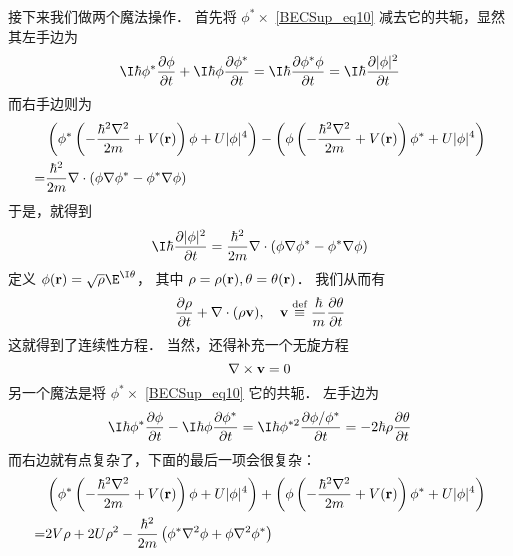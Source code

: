 接下来我们做两个魔法操作． 首先将 $\phi^*\times$ \autoref{BECSup_eq10} 减去它的共轭，显然其左手边为
\begin{equation}
\I\hbar\phi^*\frac{\partial\phi}{\partial t} + \I\hbar\phi\frac{\partial\phi^*}{\partial t} = \I\hbar\frac{\partial\phi^*\phi}{\partial t} = \I\hbar\frac{\partial|\phi|^2}{\partial t}
\end{equation}
而右手边则为
\begin{equation}
\begin{split}
&\left(\phi^* \left(-\frac{\hbar^2\nabla^2}{2m}+V({\bf r})\right)\phi + U|\phi|^4\right) -\left(\phi \left(-\frac{\hbar^2\nabla^2}{2m}+V({\bf r})\right)\phi^* + U|\phi|^4\right) \\
=& \frac{\hbar^2}{2m}\nabla\cdot\left(\phi\nabla\phi^* - \phi^*\nabla\phi\right)
\end{split}
\end{equation}
于是，就得到
\[\I\hbar\frac{\partial|\phi|^2}{\partial t} = \frac{\hbar^2}{2m}\nabla\cdot\left(\phi\nabla\phi^* - \phi^*\nabla\phi\right) \]
定义 $\phi({\bf r}) = \sqrt{\rho}\E^{\I\theta}$， 其中 $\rho = \rho({\bf r}),\theta = \theta({\bf r})$．
我们从而有
\begin{equation}\frac{\partial\rho}{\partial t} + \nabla\cdot(\rho{\bf v}),\quad {\bf v}\overset{\text{def}}{\equiv}\frac{\hbar}{m}\frac{\partial\theta}{\partial t} \end{equation}
这就得到了连续性方程． 当然，还得补充一个无旋方程
\begin{equation}
\nabla\times{\bf v}=0
\end{equation}
另一个魔法是将 $\phi^*\times$ \autoref{BECSup_eq10}%
它的共轭． 左手边为
\begin{equation}
\I\hbar\phi^*\frac{\partial\phi}{\partial t} - \I\hbar\phi\frac{\partial\phi^*}{\partial t} = \I\hbar\phi^{*2}\frac{\partial \phi/\phi^*}{\partial t} = -2\hbar\rho\frac{\partial\theta}{\partial t}
\end{equation}
而右边就有点复杂了，下面的最后一项会很复杂：
\begin{equation}
\begin{split}
&\left(\phi^* \left(-\frac{\hbar^2\nabla^2}{2m}+V({\bf r})\right)\phi + U|\phi|^4\right) + \left(\phi \left(-\frac{\hbar^2\nabla^2}{2m}+V({\bf r})\right)\phi^* + U|\phi|^4\right) \\
=& 2V\rho + 2U\rho^2 - \frac{\hbar^2}{2m}\left(\phi^*\nabla^2\phi + \phi\nabla^2\phi^*\right)
\end{split}
\end{equation}

